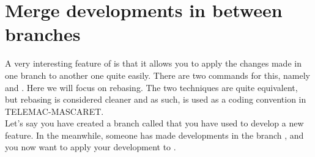 \section{Merge developments in between branches}

A very interesting feature of  is that it allows you to apply the
changes made in one branch to another one quite easily. There are two commands
for this, namely  and . Here we will
focus on rebasing. The two techniques are quite equivalent, but rebasing is
considered cleaner and as such, is used as a coding convention in
TELEMAC-MASCARET.\\

Let's say you have created a branch called  that you have
used to develop a new feature. In the meanwhile, someone has made developments
in the branch , and you now want to apply your
development to .\\

